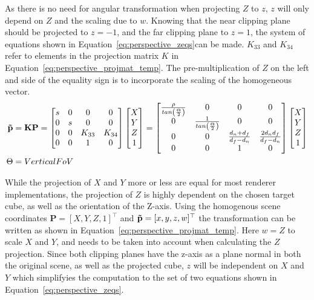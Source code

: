 As there is no need for angular transformation when projecting $Z$ to $z$, $z$ will only depend on $Z$ and the scaling due to $w$. Knowing that the near clipping plane should be projected to $z=-1$, and the far clipping plane to $z=1$, the system of equations shown in Equation~\eqref{eq:perspective_zeqs}can be made. $K_{33}$ and $K_{34}$ refer to elements in the projection matrix $K$ in Equation~\eqref{eq:perspective_projmat_temp}. The pre-multiplication of $Z$ on the left and side of the equality sign is to incorporate the scaling of the homogeneous vector.
\begin{equation}
    \begin{aligned}
        \mathbf{\Tilde{p}} &= \mathbf{K}\mathbf{P} = \begin{bmatrix}
            s & 0 & 0 & 0 \\
            0 & s & 0 & 0 \\
            0 & 0 & K_{33} & K_{34} \\
            0 & 0 & 1 & 0
        \end{bmatrix} \begin{bmatrix}
            X \\ Y \\ Z \\ 1
        \end{bmatrix} = \begin{bmatrix}
            \frac{\rho}{tan\left(\frac{\Theta}{2}\right)}& 0 & 0 & 0 \\
            0 & \frac{1}{tan\left(\frac{\Theta}{2}\right)}& 0 & 0 \\
            0 & 0 & \frac{d_n+d_f}{d_f-d_n} & \frac{2d_n d_f}{d_f-d_n} \\
            0 & 0 & 1 & 0
        \end{bmatrix} \begin{bmatrix}
            X \\ Y \\ Z \\ 1
        \end{bmatrix} \\
        \Theta &= Vertical FoV
    \end{aligned}
    \label{eq:perspective_projmat_temp}
\end{equation}


While the projection of $X$ and $Y$ more or less are equal for most renderer implementations, the projection of $Z$ is highly dependent on the chosen target cube, as well as the orientation of the Z-axis. Using the homogenous scene coordinates $\mathbf{P} = [X,Y,Z,1]^\top$ and $\mathbf{\Tilde{p}} = [x,y,z,w]^\top$ the transformation can be written as shown in Equation~\eqref{eq:perspective_projmat_temp}. Here $w = Z$ to scale $X$ and $Y$, and needs to be taken into account when calculating the $Z$ projection. Since both clipping planes have the z-axis as a plane normal in both the original scene, as well as the projected cube, $z$ will be independent on $X$ and $Y$ which simplifyies the computation to the set of two equations shown in Equation~\eqref{eq:perspective_zeqs}.

